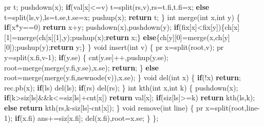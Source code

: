 \documentclass[
]{article}
\newenvironment{Shaded}{}{}
\newcommand{\ControlFlowTok}[1]{\textcolor[rgb]{0.00,0.44,0.13}{\textbf{#1}}}
\newcommand{\DataTypeTok}[1]{\textcolor[rgb]{0.56,0.13,0.00}{#1}}
\newcommand{\DecValTok}[1]{\textcolor[rgb]{0.25,0.63,0.44}{#1}}
\newcommand{\NormalTok}[1]{#1}
\begin{document}
\begin{Shaded}
\begin{Highlighting}[]
\NormalTok{        pr t; pushdown(x);}
        \ControlFlowTok{if}\NormalTok{(val[x]\textless{}=v) t=split(rs,v),rs=t.fi,t.fi=x;}
        \ControlFlowTok{else}\NormalTok{ t=split(ls,v),ls=t.se,t.se=x;}
\NormalTok{        pushup(x);}
        \ControlFlowTok{return}\NormalTok{ t;}
\NormalTok{    \}}
    \DataTypeTok{int}\NormalTok{ merge(}\DataTypeTok{int}\NormalTok{ x,}\DataTypeTok{int}\NormalTok{ y)}
\NormalTok{    \{}
        \ControlFlowTok{if}\NormalTok{(x*y==}\DecValTok{0}\NormalTok{) }\ControlFlowTok{return}\NormalTok{ x+y;}
\NormalTok{        pushdown(x),pushdown(y);}
        \ControlFlowTok{if}\NormalTok{(fix[x]\textless{}fix[y])\{ch[x][}\DecValTok{1}\NormalTok{]=merge(ch[x][}\DecValTok{1}\NormalTok{],y);pushup(x);}\ControlFlowTok{return}\NormalTok{ x;\}}
        \ControlFlowTok{else}\NormalTok{\{ch[y][}\DecValTok{0}\NormalTok{]=merge(x,ch[y][}\DecValTok{0}\NormalTok{]);pushup(y);}\ControlFlowTok{return}\NormalTok{ y;\}}
\NormalTok{    \}}
    \DataTypeTok{void}\NormalTok{ insert(}\DataTypeTok{int}\NormalTok{ v)}
\NormalTok{    \{}
\NormalTok{        pr x=split(root,v);}
\NormalTok{        pr y=split(x.fi,v{-}}\DecValTok{1}\NormalTok{);}
        \ControlFlowTok{if}\NormalTok{(y.se)}
\NormalTok{        \{}
\NormalTok{            cnt[y.se]++,pushup(y.se);}
\NormalTok{            root=merge(merge(y.fi,y.se),x.se);}
            \ControlFlowTok{return}\NormalTok{;}
\NormalTok{        \}}
        \ControlFlowTok{else}\NormalTok{ root=merge(merge(y.fi,newnode(v)),x.se);}
\NormalTok{    \}}
    \DataTypeTok{void}\NormalTok{ del(}\DataTypeTok{int}\NormalTok{ x)}
\NormalTok{    \{}
        \ControlFlowTok{if}\NormalTok{(!x) }\ControlFlowTok{return}\NormalTok{;}
\NormalTok{        rec.pb(x);}
        \ControlFlowTok{if}\NormalTok{(ls) del(ls);}
        \ControlFlowTok{if}\NormalTok{(rs) del(rs);}
\NormalTok{    \}}
    \DataTypeTok{int}\NormalTok{ kth(}\DataTypeTok{int}\NormalTok{ x,}\DataTypeTok{int}\NormalTok{ k)}
\NormalTok{    \{}
\NormalTok{        pushdown(x);}
        \ControlFlowTok{if}\NormalTok{(k\textgreater{}siz[ls]\&\&k\textless{}=siz[ls]+cnt[x]) }\ControlFlowTok{return}\NormalTok{ val[x];}
        \ControlFlowTok{if}\NormalTok{(siz[ls]\textgreater{}=k) }\ControlFlowTok{return}\NormalTok{ kth(ls,k);}
        \ControlFlowTok{else} \ControlFlowTok{return}\NormalTok{ kth(rs,k{-}siz[ls]{-}cnt[x]);}
\NormalTok{    \}}
    \DataTypeTok{void}\NormalTok{ remove(}\DataTypeTok{int}\NormalTok{ line)}
\NormalTok{    \{}
\NormalTok{        pr x=split(root,line{-}}\DecValTok{1}\NormalTok{);}
        \ControlFlowTok{if}\NormalTok{(x.fi) ans+=siz[x.fi];}
\NormalTok{        del(x.fi),root=x.se;}
\NormalTok{    \}}
\NormalTok{\};}
\end{Highlighting}
\end{Shaded}
\end{document}
